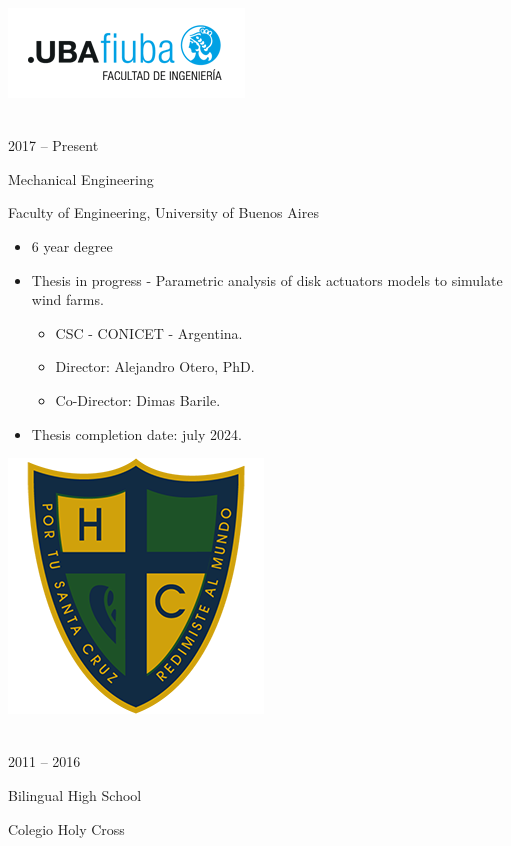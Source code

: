 \documentclass[a4paper,10pt]{article}
\newlength{\cvcolumngapwidth}
\newlength{\cvleftcolumnwidth}
\newlength{\cvrightcolumnwidth}
\newcommand{\cvtitlestyle}[1]{{\large\cvtitlefont\textcolor{cvtitlecolor}{#1}}}
\newcommand{\cvdurationstyle}[1]{{\small\cvdurationfont\textcolor{cvdurationcolor}{#1}}}
\newlength{\cvafteritemskipamount}
\newlength{\cvaftertitleskipamount}
\newlength{\cvparskip}
\newcommand{\cvitem}[2]{
    \begin{minipage}[t]{\cvleftcolumnwidth}
        \raggedleft #1
    \end{minipage}%
    \hspace{\cvcolumngapwidth}%
    \begin{minipage}[t]{\cvrightcolumnwidth}
        \setlength{\parskip}{\cvparskip} #2
    \end{minipage}

    \vspace{\cvafteritemskipamount}
}
\newcommand{\cvtitle}[1]{
    \cvtitlestyle{#1}

    \vspace{\cvaftertitleskipamount}
    \vspace{-\cvparskip}
}
\begin{document}
\cvitem{
 	\begin{minipage}{\textwidth}
   \begin{flushright}
		  \includegraphics[height=0.25\textwidth]{../logos-photos/Logo_FIUBA_new.png}   
    \end{flushright}  
  \end{minipage} \\
  \vspace{0.1cm}
  \cvdurationstyle{2017 -- Present}
}{
  \cvtitle{Mechanical Engineering}

    Faculty of Engineering, University of Buenos Aires
    
    \begin{itemize}[leftmargin=*]
      \item 6 year degree
      \item \textsf{Thesis in progress - Parametric analysis of disk actuators models to simulate wind farms.} 
        \begin{itemize}
          \item CSC - CONICET - Argentina.
          \item Director: Alejandro Otero, PhD.
          \item Co-Director: Dimas Barile.
        \end{itemize}
        \item Thesis completion date: july 2024.
    \end{itemize}
}


\cvitem{
    \begin{minipage}{\textwidth}
        \flushright
        \includegraphics[height=0.2\textwidth]{../logos-photos/Logo_HC.png}   
    \end{minipage}\\  
    \vspace{0.1cm}
    \cvdurationstyle{2011 -- 2016}
}{
    \cvtitle{Bilingual High School}

    Colegio Holy Cross
}
\end{document}
